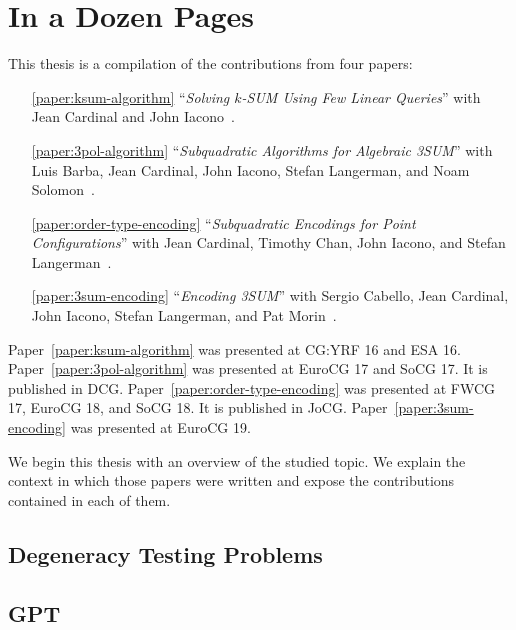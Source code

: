 \chapter{In a Dozen Pages}



This thesis is a compilation of the contributions from four papers:
%
\begin{enumerate}
	\item[\ref{paper:ksum-algorithm}] ``\emph{Solving \(k\)-SUM Using Few
		Linear Queries}''
		with Jean Cardinal and John Iacono~\cite{CIO16}.
	\item[\ref{paper:3pol-algorithm}] ``\emph{Subquadratic Algorithms for
		Algebraic 3SUM}''
		with Luis Barba, Jean Cardinal, John Iacono, Stefan Langerman, and Noam Solomon~\cite{BCILOS19}.
	\item[\ref{paper:order-type-encoding}] ``\emph{Subquadratic Encodings for
		Point Configurations}''
		with Jean Cardinal, Timothy Chan, John Iacono, and Stefan Langerman~\cite{CCILO19}.
	\item[\ref{paper:3sum-encoding}] ``\emph{Encoding 3SUM}''
		with Sergio Cabello, Jean Cardinal, John Iacono, Stefan Langerman,
		and Pat Morin~\cite{CCILMO19}.
\end{enumerate}
%
Paper~\ref{paper:ksum-algorithm} was presented at CG:YRF 16 and ESA 16.
%
Paper~\ref{paper:3pol-algorithm} was presented at EuroCG 17 and SoCG 17. It is published in DCG.
%
Paper~\ref{paper:order-type-encoding} was presented at FWCG 17, EuroCG 18, and SoCG 18. It is published in JoCG.
%
Paper~\ref{paper:3sum-encoding} was presented at EuroCG 19.

We begin this thesis with an overview of the studied topic.
%
We explain the context in which those papers were written and expose
the contributions contained in each of them.

\section*{Degeneracy Testing Problems}


\section*{GPT}


